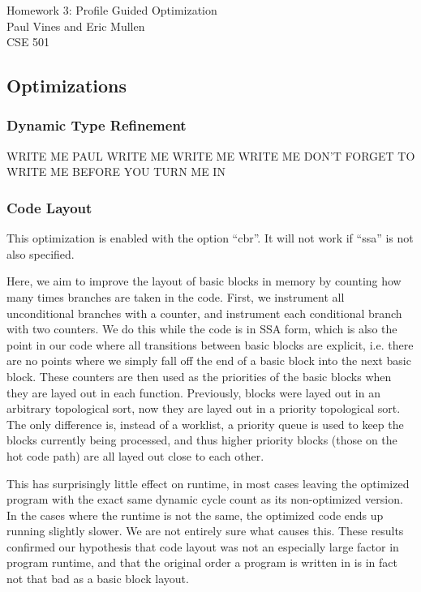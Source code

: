 \documentclass[12pt,letterpaper]{article}
\begin{document}
\begin{flushright}
Homework 3: Profile Guided Optimization\\
Paul Vines and Eric Mullen\\
CSE 501\\
\end{flushright}

\subsection*{Optimizations}
\subsubsection*{Dynamic Type Refinement}
WRITE ME PAUL WRITE ME WRITE ME WRITE ME DON'T FORGET TO WRITE ME BEFORE YOU TURN ME IN
\subsubsection*{Code Layout}

This optimization is enabled with the option ``cbr''. It will not work
if ``ssa'' is not also specified.

Here, we aim to improve the layout of basic blocks in memory by
counting how many times branches are taken in the code. First, we
instrument all unconditional branches with a counter, and instrument
each conditional branch with two counters. We do this while the code
is in SSA form, which is also the point in our code where all
transitions between basic blocks are explicit, i.e. there are no
points where we simply fall off the end of a basic block into the next
basic block. These counters are then used as the priorities of the
basic blocks when they are layed out in each function. Previously,
blocks were layed out in an arbitrary topological sort, now they are
layed out in a priority topological sort. The only difference is,
instead of a worklist, a priority queue is used to keep the blocks
currently being processed, and thus higher priority blocks (those on
the hot code path) are all layed out close to each other.

This has surprisingly little effect on runtime, in most cases leaving
the optimized program with the exact same dynamic cycle count as its
non-optimized version. In the cases where the runtime is not the same,
the optimized code ends up running slightly slower. We are not
entirely sure what causes this. These results confirmed our hypothesis
that code layout was not an especially large factor in program
runtime, and that the original order a program is written in is in
fact not that bad as a basic block layout.
\end{document}
